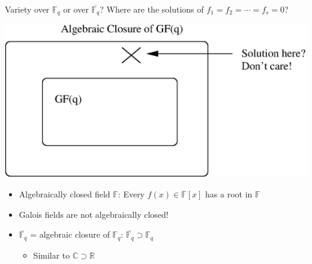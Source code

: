 \documentclass[xcolor=dvipsnames]{beamer}
\begin{document}
\begin{frame}{\large {Variety over $\mathbb{F}_q$ or over $\overline{\mathbb{F}_q}$?}}
Where are the solutions of $f_1 = f_2 = \cdots = f_s = 0$?

\begin{center}
    \includegraphics[scale=0.45]{gfq-closure.eps}
\end{center}


\begin{itemize}
\item \alert{Algebraically closed field} $\mathbb{F}$: Every $f(x) \in
  \mathbb{F}[x]$ has a root in $\mathbb{F}$
\item Galois fields are not algebraically closed!
\item $\overline{\mathbb{F}_q}$ = algebraic closure of $\mathbb{F}_q$:
  $\overline{\mathbb{F}_q} \supset \mathbb{F}_q$

\begin{itemize}
\item Similar to $\mathbb{C} \supset \mathbb{R}$
\end{itemize}

\end{itemize}

\end{frame}
\end{document}
